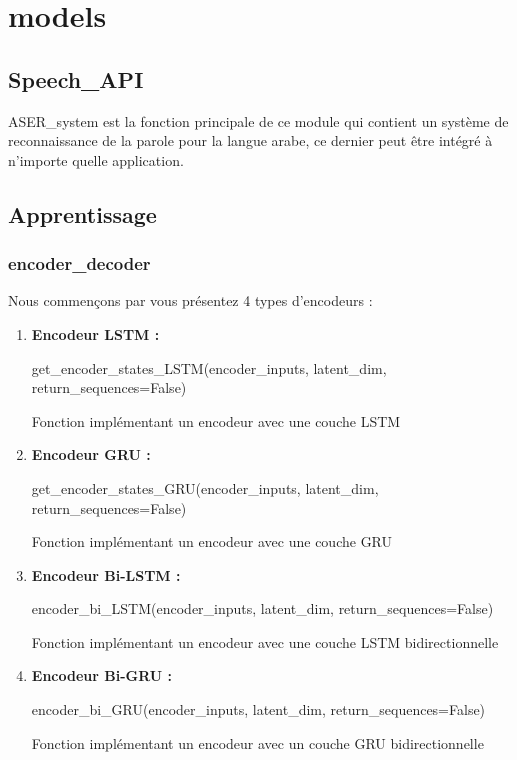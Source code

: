 \section{models}
\subsection{Speech\_API}
    ASER\_system est la fonction principale de ce module qui contient un système de reconnaissance de la parole pour la langue arabe, ce dernier peut être intégré à n'importe quelle application. 
    
\subsection{Apprentissage}
    \subsubsection{encoder\_decoder}
    Nous commençons par vous présentez 4 types d'encodeurs :
    \begin{enumerate}
        \item \textbf{Encodeur LSTM :} 
            \begin{tcolorbox}
                get\_encoder\_states\_LSTM(encoder\_inputs, latent\_dim, return\_sequences=False)
            \end{tcolorbox}
            Fonction implémentant un encodeur avec une couche LSTM \\
        \item \textbf{Encodeur GRU :} 
            \begin{tcolorbox}
            get\_encoder\_states\_GRU(encoder\_inputs, latent\_dim, return\_sequences=False)
            \end{tcolorbox}
            Fonction implémentant un encodeur avec une couche GRU \\
        \item \textbf{Encodeur Bi-LSTM :}
            \begin{tcolorbox}
            encoder\_bi\_LSTM(encoder\_inputs, latent\_dim, return\_sequences=False)
            \end{tcolorbox}
            Fonction implémentant un encodeur avec une couche LSTM  bidirectionnelle \\
        \item \textbf{Encodeur Bi-GRU :}
            \begin{tcolorbox}
            encoder\_bi\_GRU(encoder\_inputs, latent\_dim, return\_sequences=False)
            \end{tcolorbox}
            Fonction implémentant un encodeur avec un couche GRU bidirectionnelle \\
    \end{enumerate}
